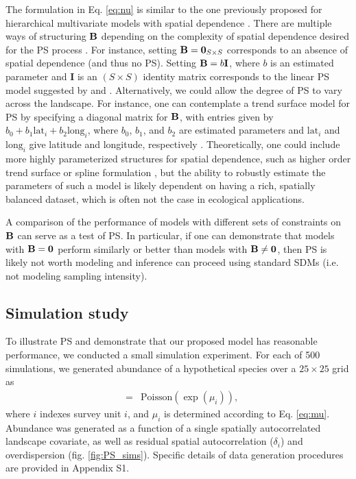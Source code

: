 \documentclass[times,mee,doublespace,]{besauth2}
\begin{document}
 The formulation in Eq. \ref{eq:nu} is similar to the one previously proposed for hierarchical multivariate models with spatial dependence \citep[cf.][]{RoyleBerliner1999}.  There are multiple ways of structuring ${\bf B}$ depending on the complexity of spatial dependence desired for the PS process \citep{RoyleBerliner1999}.  For instance, setting ${\bf B} = {\bf 0}_{S \times S}$ corresponds to an absence of spatial dependence (and thus no PS).  Setting ${\bf B} = b {\bf I}$, where $b$ is an estimated parameter and {\bf I} is an $(S \times S)$ identity matrix corresponds to the linear PS model suggested by \citet{DiggleEtAl2010} and \citet{PatiEtAl2011}.  Alternatively, we could allow the degree of PS to vary across the landscape.  For instance, one can contemplate a trend surface model for PS by specifying a diagonal matrix for ${\bf B}$, with entries given by $b_0 + b_1 \textrm{lat}_i + b_2 \textrm{long}_i$, where $b_0$, $b_1$, and $b_2$ are estimated parameters and $\textrm{lat}_i$ and $\textrm{long}_i$ give latitude and longitude, respectively \citep{RoyleBerliner1999}.  Theoretically, one could include more highly parameterized structures for spatial dependence, such as higher order trend surface or spline formulation \citep{RoyleBerliner1999}, but the ability to robustly estimate the parameters of such a model is likely dependent on having a rich, spatially balanced dataset, which is often not the case in ecological applications.

A comparison of the performance of models with different sets of constraints on ${\bf B}$ can serve as a test of PS.  In particular, if one can demonstrate that models with ${\bf B}={\bf 0}$ perform similarly or better than models with ${\bf B} \ne {\bf 0}$, then PS is likely not worth modeling and inference can proceed using standard SDMs (i.e. not modeling sampling intensity).


\subsection{Simulation study}

To illustrate PS and demonstrate that our proposed model has reasonable performance, we conducted a small simulation experiment.  For each of 500 simulations, we generated abundance of a hypothetical species over a $25 \times 25$ grid as
\begin{eqnarray*}
  [N_i|\mu_i] & = & \textrm{Poisson}(\exp(\mu_i)),
\end{eqnarray*}
where $i$ indexes survey unit $i$, and $\mu_i$ is determined according to Eq. \ref{eq:mu}. Abundance was generated as a function of a single spatially autocorrelated landscape covariate, as well as residual spatial autocorrelation ($\delta_i$) and overdispersion (fig. \ref{fig:PS_sims}). Specific details of data generation procedures are provided in Appendix S1.
\end{document}
